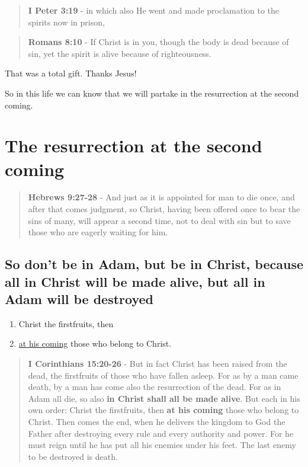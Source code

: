 \documentclass[11pt]{article}
\begin{document}
\begin{quote}
\textbf{I Peter 3:19} - in which also He went and made proclamation to the spirits now in prison,
\end{quote}

\begin{quote}
\textbf{Romans 8:10} - If Christ is in you, though the body is dead because of sin, yet the spirit is alive because of righteousness.
\end{quote}

That was a total gift. Thanks Jesus!

So in this life we can know that we will partake in the resurrection at the second coming.

\section{The resurrection at the second coming}
\label{sec:org88a2a1e}
\begin{quote}
\textbf{Hebrews 9:27-28} - And just as it is appointed for man to die once, and after that comes judgment, so Christ, having been offered once to bear the sins of many, will appear a second time, not to deal with sin but to save those who are eagerly waiting for him.
\end{quote}

\subsection{So don't be in Adam, but be in Christ, because all in Christ will be made alive, but all in Adam will be destroyed}
\label{sec:org5de56af}
\begin{enumerate}
\item Christ the firstfruits, then
\item \uline{at his coming} those who belong to Christ.
\end{enumerate}

\begin{quote}
\textbf{I Corinthians 15:20-26} - But in fact Christ has been raised from the dead, the firstfruits of those who have fallen asleep.  For as by a man came death, by a man has come also the resurrection of the dead.  For as in Adam all die, so also \textbf{in Christ shall all be made alive}.  But each in his own order: Christ the firstfruits, then \textbf{at his coming} those who belong to Christ.  Then comes the end, when he delivers the kingdom to God the Father after destroying every rule and every authority and power.  For he must reign until he has put all his enemies under his feet.  The last enemy to be destroyed is death.
\end{quote}
\end{document}
